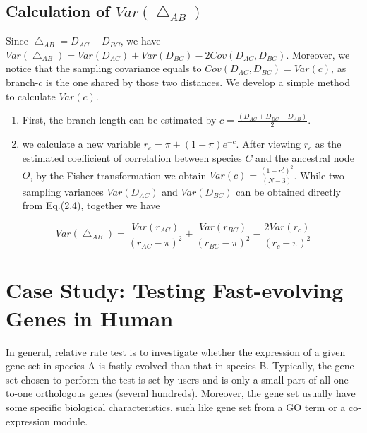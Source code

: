 \documentclass[]{book}
\providecommand{\tightlist}{%
  \setlength{\itemsep}{0pt}\setlength{\parskip}{0pt}}
\begin{document}
\hypertarget{calculation-of-varbigtriangleup_ab}{%
\subsection{\texorpdfstring{Calculation of \(Var(\bigtriangleup_{AB})\)}{Calculation of Var(\textbackslash{}bigtriangleup\_\{AB\})}}\label{calculation-of-varbigtriangleup_ab}}

Since \(\bigtriangleup_{AB}=D_{AC}-D_{BC}\), we have \(Var(\bigtriangleup_{AB})=Var(D_{AC})+Var(D_{BC})-2Cov(D_{AC}, D_{BC})\). Moreover, we notice that the sampling covariance equals to \(Cov(D_{AC}, D_{BC})=Var(c)\), as branch-\(c\) is the one shared by those two distances. We develop a simple method to calculate \(Var(c)\).

\begin{enumerate}
\def\labelenumi{\arabic{enumi}.}
\tightlist
\item
  First, the branch length can be estimated by \(c=\frac{(D_{AC}+D_{BC}-D_{AB})}{2}\).
\item
  we calculate a new variable \(r_c=\pi+(1-\pi)e^{-c}\). After viewing \(r_c\) as the estimated coefficient of correlation between species \(C\) and the ancestral node \(O\), by the Fisher transformation we obtain \(Var(c)=\frac{(1-r_c^2)^2}{(N-3)}\). While two sampling variances \(Var(D_{AC})\) and \(Var(D_{BC})\) can be obtained directly from Eq.(2.4), together we have
\end{enumerate}

\[Var\left(\bigtriangleup_{AB}\right)=\frac{Var\left(r_{AC}\right)}{\left(r_{AC}-\pi\right)^2}+\frac{Var\left(r_{BC}\right)}{\left(r_{BC}-\pi\right)^2}-\frac{2Var\left(r_c\right)}{\left(r_c-\pi\right)^2}\tag{2.5}\]
\newpage

\hypertarget{case-study-testing-fast-evolving-genes-in-human}{%
\section{Case Study: Testing Fast-evolving Genes in Human}\label{case-study-testing-fast-evolving-genes-in-human}}

In general, relative rate test is to investigate whether the expression of a given gene set in species A is fastly evolved than that in species B. Typically, the gene set chosen to perform the test is set by users and is only a small part of all one-to-one orthologous genes (several hundreds). Moreover, the gene set usually have some specific biological characteristics, such like gene set from a GO term or a co-expression module.
\end{document}
